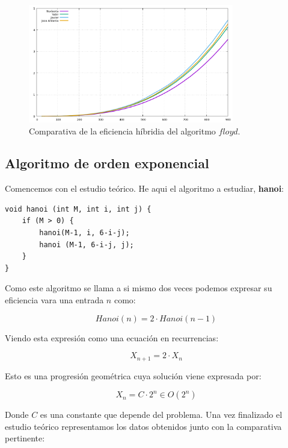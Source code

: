 \documentclass[11pt,a4paper]{article}
\begin{document}
\begin{figure}[H]
	\centering
	\includegraphics[width=0.8\textwidth]{../plots/floyd}
	\caption{Comparativa de la eficiencia híbridia del algoritmo $floyd$.}
\end{figure}

\subsection{Algoritmo de orden exponencial}

Comencemos con el estudio teórico. He aqui el algoritmo a estudiar, \textbf{hanoi}:

\begin{lstlisting}
void hanoi (int M, int i, int j) {
	if (M > 0) {
		hanoi(M-1, i, 6-i-j);
		hanoi (M-1, 6-i-j, j);
	}
}	     	
\end{lstlisting}

Como este algoritmo se llama a si mismo dos veces podemos expresar su eficiencia vara una entrada $n$ como:

$$Hanoi(n) = 2 \cdot Hanoi(n-1)$$

Viendo esta expresión como una ecuación en recurrencias:

$$X_{n+1} = 2 \cdot X_n$$

Esto es una progresión geométrica cuya solución viene expresada por:

$$X_n = C \cdot 2^n \in O(2^n)$$

Donde $C$ es una constante que depende del problema. Una vez finalizado el estudio teórico representamos los datos obtenidos junto con la comparativa pertinente:
\end{document}
